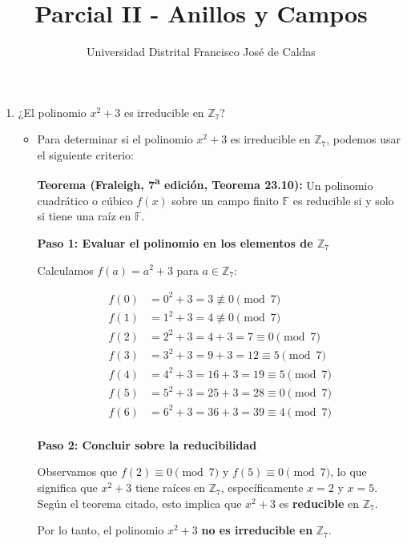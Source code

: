 \documentclass[12pt]{article}
\title{Parcial II - Anillos y Campos}
\author{Universidad Distrital Francisco José de Caldas}
\date{}
\begin{document}
\maketitle

\begin{enumerate}
    \item ¿El polinomio \(x^2 + 3\) es irreducible en \(\mathbb{Z}_7\)?
    \begin{itemize}
        \item Para determinar si el polinomio $ x^2 + 3 $ es irreducible en $ \mathbb{Z}_7 $, podemos usar el siguiente criterio:
        
        \textbf{Teorema (Fraleigh, 7\textsuperscript{a} edición, Teorema 23.10):}  
        Un polinomio cuadrático o cúbico $ f(x) $ sobre un campo finito $ \mathbb{F} $ es reducible si y solo si tiene una raíz en $ \mathbb{F} $.
    
        \textbf{Paso 1: Evaluar el polinomio en los elementos de $ \mathbb{Z}_7 $}
    
        Calculamos $ f(a) = a^2 + 3 $ para $ a \in \mathbb{Z}_7 $:
    
        \[
        \begin{aligned}
        f(0) &= 0^2 + 3 = 3 \not\equiv 0 \pmod{7} \\
        f(1) &= 1^2 + 3 = 4 \not\equiv 0 \pmod{7} \\
        f(2) &= 2^2 + 3 = 4 + 3 = 7 \equiv 0 \pmod{7} \\
        f(3) &= 3^2 + 3 = 9 + 3 = 12 \equiv 5 \pmod{7} \\
        f(4) &= 4^2 + 3 = 16 + 3 = 19 \equiv 5 \pmod{7} \\
        f(5) &= 5^2 + 3 = 25 + 3 = 28 \equiv 0 \pmod{7} \\
        f(6) &= 6^2 + 3 = 36 + 3 = 39 \equiv 4 \pmod{7} \\
        \end{aligned}
        \]
    
        \textbf{Paso 2: Concluir sobre la reducibilidad}
    
        Observamos que $ f(2) \equiv 0 \pmod{7} $ y $ f(5) \equiv 0 \pmod{7} $, lo que significa que $ x^2 + 3 $ tiene raíces en $ \mathbb{Z}_7 $, específicamente $ x = 2 $ y $ x = 5 $. Según el teorema citado, esto implica que $ x^2 + 3 $ es \textbf{reducible} en $ \mathbb{Z}_7 $.
    
        Por lo tanto, el polinomio $ x^2 + 3 $ \textbf{no es irreducible en} $ \mathbb{Z}_7 $.
    \end{itemize}
    

\end{enumerate}
\end{document}
